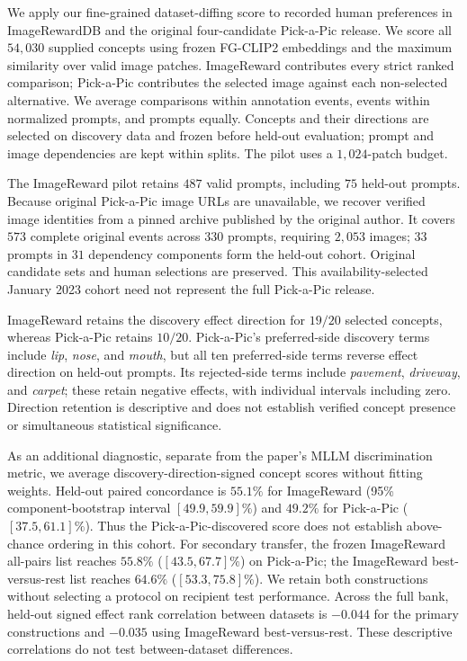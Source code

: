 We apply our fine-grained dataset-diffing score to recorded human preferences in ImageRewardDB and the original four-candidate Pick-a-Pic release. We score all $54{,}030$ supplied concepts using frozen FG-CLIP2 embeddings and the maximum similarity over valid image patches. ImageReward contributes every strict ranked comparison; Pick-a-Pic contributes the selected image against each non-selected alternative. We average comparisons within annotation events, events within normalized prompts, and prompts equally. Concepts and their directions are selected on discovery data and frozen before held-out evaluation; prompt and image dependencies are kept within splits. The pilot uses a $1{,}024$-patch budget.

The ImageReward pilot retains $487$ valid prompts, including $75$ held-out prompts. Because original Pick-a-Pic image URLs are unavailable, we recover verified image identities from a pinned archive published by the original author. It covers $573$ complete original events across $330$ prompts, requiring $2{,}053$ images; $33$ prompts in $31$ dependency components form the held-out cohort. Original candidate sets and human selections are preserved. This availability-selected January 2023 cohort need not represent the full Pick-a-Pic release.

ImageReward retains the discovery effect direction for $19/20$ selected concepts, whereas Pick-a-Pic retains $10/20$. Pick-a-Pic's preferred-side discovery terms include \emph{lip}, \emph{nose}, and \emph{mouth}, but all ten preferred-side terms reverse effect direction on held-out prompts. Its rejected-side terms include \emph{pavement}, \emph{driveway}, and \emph{carpet}; these retain negative effects, with individual intervals including zero. Direction retention is descriptive and does not establish verified concept presence or simultaneous statistical significance.

As an additional diagnostic, separate from the paper's MLLM discrimination metric, we average discovery-direction-signed concept scores without fitting weights. Held-out paired concordance is $55.1\%$ for ImageReward (95\% component-bootstrap interval $[49.9,59.9]\%$) and $49.2\%$ for Pick-a-Pic ($[37.5,61.1]\%$). Thus the Pick-a-Pic-discovered score does not establish above-chance ordering in this cohort. For secondary transfer, the frozen ImageReward all-pairs list reaches $55.8\%$ ($[43.5,67.7]\%$) on Pick-a-Pic; the ImageReward best-versus-rest list reaches $64.6\%$ ($[53.3,75.8]\%$). We retain both constructions without selecting a protocol on recipient test performance. Across the full bank, held-out signed effect rank correlation between datasets is $-0.044$ for the primary constructions and $-0.035$ using ImageReward best-versus-rest. These descriptive correlations do not test between-dataset differences.

